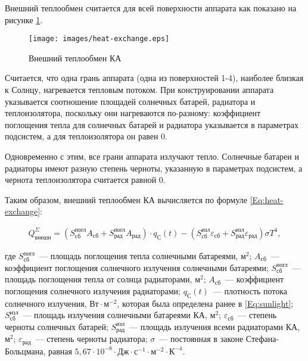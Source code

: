 \documentclass[12pt,a4paper]{article}
\begin{document}
Внешний теплообмен считается для всей поверхности аппарата как показано на рисунке \ref{Pic:heat-exchange}.

\begin{figure}[tbh]
  \begin{center}
    \texttt{[image: images/heat-exchange.eps]}
    \caption{Внешний теплообмен КА}
    \label{Pic:heat-exchange}
  \end{center}
\end{figure}

Считается, что одна грань аппарата (одна из поверхностей 1-4), наиболее близкая к Солнцу,
нагревается тепловым потоком. При конструировании аппарата указывается соотношение
площадей солнечных батарей, радиатора и теплоизолятора, поскольку они нагреваются
по-разному: коэффициент поглощения тепла для солнечных батарей и радиатора указывается в
параметрах подсистем, а для теплоизолятора он равен 0.

Одновременно с этим, все грани аппарата излучают тепло. Солнечные батареи и радиаторы
имеют разную степень черноты, указанную в параметрах подсистем, а чернота теплоизолятора
считается равной 0.

Таким образом, внешний теплообмен КА вычисляется по формуле \ref{Eq:heat-exchange}:

\begin{eqnarray}
  Q^{\Sigma}_{\text{внешн}} = \left(S_{\text{сб}}^{\text{погл}} A_{\text{сб}} +
  S_{\text{рад}}^{\text{погл}} A_{\text{рад}}\right) \cdot q_{\text{С}}(t) -
  \left(S_{\text{сб}}^{\text{изл}} \varepsilon_{\text{сб}} + S_{\text{рад}}^{\text{изл}}
  \varepsilon_{\text{рад}}\right)
  \sigma T^4, \label{Eq:heat-exchange}
\end{eqnarray}

где $S_{\text{сб}}^{\text{погл}}$~--- площадь поглощения тепла солнечными батареями,
$\text{м}^2$; $A_{\text{сб}}$~--– коэффициент поглощения солнечного излучения солнечными
батареями; $S_{\text{сб}}^{\text{погл}}$~--– площадь поглощения тепла от солнца
радиаторами, $\text{м}^2$; $A_{\text{сб}}$~--– коэффициент поглощения солнечного излучения
радиаторами; $q_{\text{С}}(t)$~--– плотность потока солнечного излучения, $\text{Вт} \cdot
\text{м}^{-2}$, которая была определена ранее в \ref{Eq:sunlight};
$S_{\text{сб}}^{\text{изл}}$~--- площадь излучения солнечными батареями КА, $\text{м}^2$; $\varepsilon_{\text{сб}}$~--–
степень черноты солнечных батарей; $S_{\text{рад}}^{\text{изл}}$~--– площадь излучения
всеми радиаторами КА, $\text{м}^2$; $\varepsilon_{\text{рад}}$~--– степень черноты радиатора; $\sigma$~--- постоянная в законе
Стефана-Больцмана, равная $5,67 \cdot 10^{-8} \cdot \text{Дж} \cdot \text{с}^{-1} \cdot
\text{м}^{-2} \cdot \text{К}^{-4}$.
\end{document}

